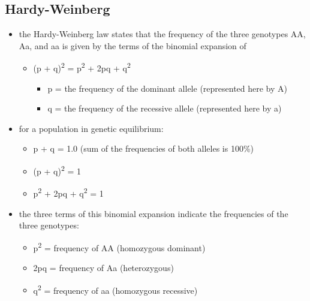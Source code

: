\documentclass[12pt]{scrartcl}
\begin{document}
\subsection{Hardy-Weinberg}
\label{sec:org4378627}
\begin{itemize}
\item the Hardy-Weinberg law states that the frequency of the three
genotypes AA, Aa, and aa is given by the terms of the binomial
expansion of
\begin{itemize}
\item (p + q)\textsuperscript{2} = p\textsuperscript{2} + 2pq + q\textsuperscript{2}
\begin{itemize}
\item p = the frequency of the dominant allele (represented here by A)
\item q = the frequency of the recessive allele (represented here by a)
\end{itemize}
\end{itemize}

\item for a population in genetic equilibrium:
\begin{itemize}
\item p + q = 1.0 (sum of the frequencies of both alleles is 100\%)
\item (p + q)\textsuperscript{2} = 1
\item p\textsuperscript{2} + 2pq + q\textsuperscript{2} = 1
\end{itemize}
\item the three terms of this binomial expansion indicate the frequencies
of the three genotypes:
\begin{itemize}
\item p\textsuperscript{2} = frequency of AA (homozygous dominant)
\item 2pq = frequency of Aa (heterozygous)
\item q\textsuperscript{2} = frequency of aa (homozygous recessive)
\end{itemize}


\end{itemize}
\end{document}
